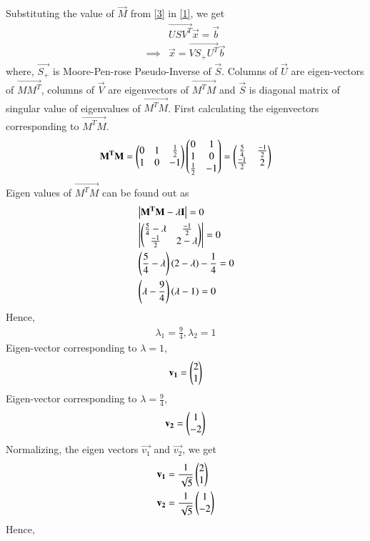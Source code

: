 \documentclass[journal,12pt,twocolumn]{IEEEtran}
\begin{document}
Substituting the value of $\vec{M}$ from \eqref{3} in \eqref{1}, we get
\begin{align}
	&\vec{USV^T}\vec{x} = \vec{b} \\
\implies& \vec{x} = \vec{VS_+U^T}\vec{b}\label{4}
\end{align}
where, $\vec{S_+}$ is Moore-Pen-rose Pseudo-Inverse of $\vec{S}$. Columns of $\vec{U}$ are eigen-vectors of $\vec{MM^T}$, columns of $\vec{V}$ are eigenvectors of $\vec{M^TM}$ and $\vec{S}$ is diagonal matrix of singular value of eigenvalues of $\vec{M^TM}$. First calculating the eigenvectors corresponding to $\vec{M^TM}$.
\begin{align}
\mathbf{M^TM} = \begin{pmatrix}0 & 1 & \frac{1}{2} \\ 1 & 0 &-1 \end{pmatrix}\begin{pmatrix}0 & 1 \\ 1 & 0 \\ \frac{1}{2} & -1\end{pmatrix} = 
\begin{pmatrix}\frac{5}{4} & \frac{-1}{2} \\ \frac{-1}{2} & 2\end{pmatrix}
\end{align}
Eigen values of $\vec{M^TM}$ can be found out as
\begin{align}
	& \left\vert\mathbf{M^TM-\lambda I}\right\vert = 0 \\
	& \left\vert\begin{pmatrix}\frac{5}{4}-\lambda & \frac{-1}{2} \\ \frac{-1}{2} & 2-\lambda\end{pmatrix}\right\vert = 0 \\
	& \left(\frac{5}{4}-\lambda\right)\left(2-\lambda\right) - \frac{1}{4} = 0 \\
	& \left(\lambda-\frac{9}{4}\right)\left(\lambda-1\right) = 0 
\end{align}
Hence,
\begin{align}
\lambda_1 = \frac{9}{4}, \lambda_2 = 1
\end{align}
Eigen-vector corresponding to $\lambda=1$,
\begin{align}
\mathbf{v_1} = \begin{pmatrix}2 \\ 1\end{pmatrix} 
\end{align}
Eigen-vector corresponding to $\lambda = \frac{9}{4}$,
\begin{align}
\mathbf{v_2} = \begin{pmatrix}1 \\ -2\end{pmatrix}
\end{align}
Normalizing, the eigen vectors $\vec{v_1}$ and $\vec{v_2}$, we get
\begin{align}
& \mathbf{v_1} = \frac{1}{\sqrt{5}}\begin{pmatrix}2 \\ 1\end{pmatrix} \\
& \mathbf{v_2} = \frac{1}{\sqrt{5}}\begin{pmatrix}1 \\ -2\end{pmatrix} 
\end{align}
Hence,
\end{document}
